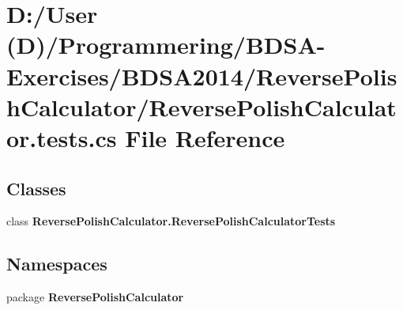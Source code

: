 \section{D\+:/\+User (D)/\+Programmering/\+B\+D\+S\+A-\/\+Exercises/\+B\+D\+S\+A2014/\+Reverse\+Polish\+Calculator/\+Reverse\+Polish\+Calculator.tests.\+cs File Reference}
\label{_reverse_polish_calculator_8tests_8cs}
\subsection*{Classes}
\begin{DoxyCompactItemize}
\item 
class {\bf Reverse\+Polish\+Calculator.\+Reverse\+Polish\+Calculator\+Tests}
\end{DoxyCompactItemize}
\subsection*{Namespaces}
\begin{DoxyCompactItemize}
\item 
package {\bf Reverse\+Polish\+Calculator}
\end{DoxyCompactItemize}
